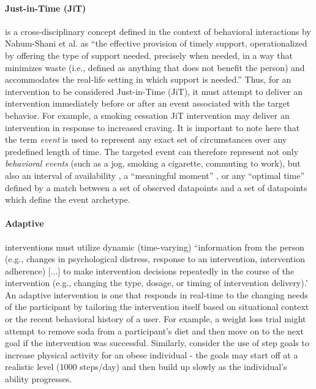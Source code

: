 \documentclass[runningheads,a4paper]{llncs}
\begin{document}
\paragraph{Just-in-Time (JiT)} is a cross-disciplinary concept defined in the context of behavioral interactions by Nahum-Shani et al. as ``the effective provision of timely support, operationalized by offering the type of support needed, precisely when needed, in a way that minimizes waste (i.e., defined as anything that does not benefit the person) and accommodates the real-life setting in which support is needed.'' \cite{nahum2014}
Thus, for an intervention to be considered Just-in-Time (JiT), it must attempt to deliver an intervention immediately before or after an event associated with the target behavior. 
For example, a smoking cessation JiT intervention may deliver an intervention in response to increased craving.
It is important to note here that the term \emph{event} is used to represent any exact set of circumstances over any predefined length of time.
The targeted event can therefore represent not only \emph{behavioral events} (such as a jog, smoking a cigarette, commuting to work), but also an interval of availability \cite{???}, a ``meaningful moment'' \cite{???}, or any ``optimal time'' \cite{???} defined by a match between a set of observed datapoints and a set of datapoints which define the event archetype.

\paragraph{Adaptive} interventions must utilize dynamic (time-varying) ``information from the person (e.g., changes in psychological distress, response to an intervention, intervention adherence) [...] to make intervention decisions repeatedly in the course of the intervention (e.g., changing the type, dosage, or timing of intervention delivery).' \cite{nahum2014}
An adaptive intervention is one that responds in real-time to the changing needs of the participant by tailoring the intervention itself based on situational context or the recent behavioral history of a user. 
For example, a weight loss trial might attempt to remove soda from a participant's diet and then move on to the next goal if the intervention was successful.
Similarly, consider the use of step goals to increase physical activity for an obese individual - the goals may start off at a realistic level (1000 steps/day) and then build up slowly as the individual's ability progresses.
\end{document}
